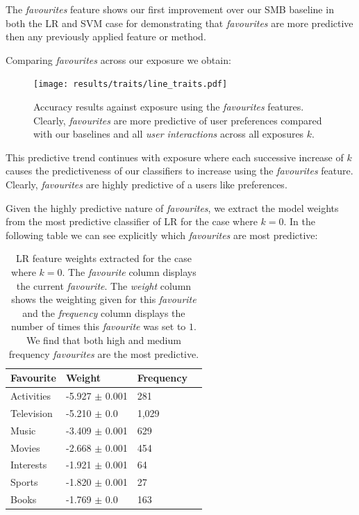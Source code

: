 \clearpage

The \emph{favourites} feature shows our first improvement over our SMB baseline in both the LR and SVM case for demonstrating that 
\emph{favourites} are more predictive then any previously applied feature or method.

Comparing \emph{favourites} across our exposure we obtain:

\begin{figure}[h]
	\begin{center}
		\texttt{[image: results/traits/line\_traits.pdf]}
		\caption{Accuracy results against exposure using the \emph{favourites} features. Clearly, \emph{favourites} are more predictive of
				 user preferences compared with our baselines and all \emph{user interactions} across all exposures $k$.}
	\end{center}
\end{figure}

This predictive trend continues with exposure where each successive increase of $k$ causes the predictiveness of our classifiers to increase
using the \emph{favourites} feature. Clearly, \emph{favourites} are highly predictive of a users like preferences.

\clearpage

Given the highly predictive nature of \emph{favourites}, we extract the model weights from the most predictive classifier of LR for the case where $k=0$.
In the following table we can see explicitly which \emph{favourites} are most predictive:

\begin{table}[h]
\begin{minipage}[b]{1.0\textwidth}
\centering
  \begin{tabular}{|l|l|l|l|} %
  \hline
  		\textbf{Favourite} & \textbf{Weight} & \textbf{Frequency} \\ \hline
		Activities & -5.927 $\pm$ 0.001 & 281 \\ \hline
		Television & -5.210 $\pm$ 0.0 & 1,029 \\ \hline
		Music & -3.409 $\pm$ 0.001 & 629 \\ \hline
		Movies & -2.668 $\pm$ 0.001 & 454 \\ \hline
		Interests & -1.921 $\pm$ 0.001 & 64 \\ \hline
		Sports & -1.820 $\pm$ 0.001 & 27 \\ \hline		
		Books & -1.769 $\pm$ 0.0 & 163 \\ \hline		
  \end{tabular}
  \caption{LR feature weights extracted for the case where $k=0$. The \emph{favourite} column displays the current \emph{favourite}.
  The \emph{weight} column shows the weighting given for this \emph{favourite} and the \emph{frequency} column displays the number of times 
  this \emph{favourite} was set to $1$. We find that both high and medium frequency \emph{favourites} are the most predictive.}
\end{minipage}
\end{table}

